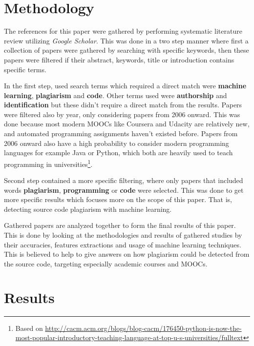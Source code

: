 \documentclass[english]{tktltiki2}
\theoremstyle{definition}
\theoremstyle{remark}
\begin{document}
\section{Methodology}


The references for this paper were gathered by performing systematic literature review utilizing \textit{Google Scholar}. This was done in a two step manner where first a collection of papers were gathered by searching with specific keywords, then these papers were filtered if their abstract, keywords, title or introduction contains specific terms. 

In the first step, used search terms which required a direct match were \textbf{machine learning}, \textbf{plagiarism} and \textbf{code}. Other terms used were \textbf{authorship} and \textbf{identification} but these didn't require a direct match from the results. Papers were filtered also by year, only considering papers from 2006 onward. This was done because most modern MOOCs like Coursera and Udacity are relatively new, and automated programming assignments haven't existed before. Papers from 2006 onward also have a high probability to consider modern programming languages for example Java or Python, which both are heavily used to teach programming in universities\footnote{Based on \url{http://cacm.acm.org/blogs/blog-cacm/176450-python-is-now-the-most-popular-introductory-teaching-language-at-top-u-s-universities/fulltext}}. 

Second step contained a more specific filtering, where only papers that included words \textbf{plagiarism}, \textbf{programming} or \textbf{code} were selected. This was done to get more specific results which focuses more on the scope of this paper. That is, detecting source code plagiarism with machine learning. 

Gathered papers are analyzed together to form the final results of this paper. This is done by looking at the methodologies and results of gathered studies by their accuracies, features extractions and usage of machine learning techniques. This is believed to help to give answers on how plagiarism could be detected from the source code, targeting especially academic courses and MOOCs.


\section{Results}
\end{document}
